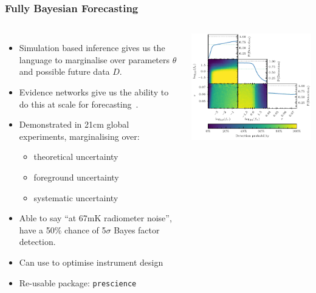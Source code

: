\documentclass[aspectratio=169]{beamer}
\begin{document}
\begin{frame}
    \frametitle{Fully Bayesian Forecasting~}
    \begin{columns}
        \begin{itemize}
            \item Simulation based inference gives us the language to marginalise over parameters $\theta$ and possible future data $D$.
            \item Evidence networks give us the ability to do this at scale for forecasting~.
            \item Demonstrated in 21cm global experiments, marginalising over:
                \begin{itemize}
                    \item theoretical uncertainty
                    \item foreground uncertainty
                    \item systematic uncertainty
                \end{itemize}
            \item Able to say ``at 67mK radiometer noise'', have a 50\% chance of 5$\sigma$ Bayes factor detection.
            \item Can use to optimise instrument design
            \item Re-usable package: \texttt{prescience}
        \end{itemize}
        \includegraphics[width=\textwidth]{figures/fbf.pdf}
    \end{columns}
\end{frame}
\end{document}

